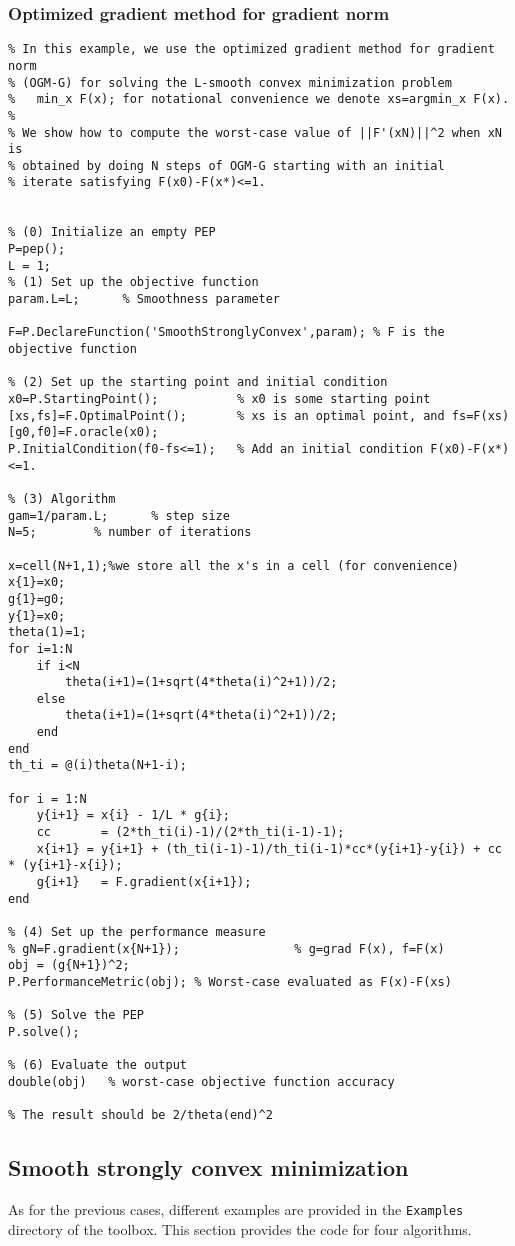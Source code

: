 \documentclass[11pt,a4paper]{article}
\begin{document}
\subsubsection{Optimized gradient method for gradient norm}
\begin{lstlisting}
% In this example, we use the optimized gradient method for gradient norm
% (OGM-G) for solving the L-smooth convex minimization problem
%   min_x F(x); for notational convenience we denote xs=argmin_x F(x).
%
% We show how to compute the worst-case value of ||F'(xN)||^2 when xN is
% obtained by doing N steps of OGM-G starting with an initial
% iterate satisfying F(x0)-F(x*)<=1.


% (0) Initialize an empty PEP
P=pep();
L = 1;
% (1) Set up the objective function
param.L=L;      % Smoothness parameter

F=P.DeclareFunction('SmoothStronglyConvex',param); % F is the objective function

% (2) Set up the starting point and initial condition
x0=P.StartingPoint();           % x0 is some starting point
[xs,fs]=F.OptimalPoint(); 		% xs is an optimal point, and fs=F(xs)
[g0,f0]=F.oracle(x0);
P.InitialCondition(f0-fs<=1);   % Add an initial condition F(x0)-F(x*)<=1.

% (3) Algorithm
gam=1/param.L;		% step size
N=5;		% number of iterations

x=cell(N+1,1);%we store all the x's in a cell (for convenience)
x{1}=x0;
g{1}=g0;
y{1}=x0;
theta(1)=1;
for i=1:N
	if i<N
		theta(i+1)=(1+sqrt(4*theta(i)^2+1))/2;
	else
		theta(i+1)=(1+sqrt(4*theta(i)^2+1))/2;
	end
end
th_ti = @(i)theta(N+1-i);

for i = 1:N
	y{i+1} = x{i} - 1/L * g{i};
	cc       = (2*th_ti(i)-1)/(2*th_ti(i-1)-1);
	x{i+1} = y{i+1} + (th_ti(i-1)-1)/th_ti(i-1)*cc*(y{i+1}-y{i}) + cc * (y{i+1}-x{i});
	g{i+1}   = F.gradient(x{i+1});
end

% (4) Set up the performance measure
% gN=F.gradient(x{N+1});                % g=grad F(x), f=F(x)
obj = (g{N+1})^2;
P.PerformanceMetric(obj); % Worst-case evaluated as F(x)-F(xs)

% (5) Solve the PEP
P.solve();

% (6) Evaluate the output
double(obj)   % worst-case objective function accuracy

% The result should be 2/theta(end)^2
\end{lstlisting}
\newpage 
\subsection{Smooth strongly convex minimization}
As for the previous cases, different examples are provided in the \verb?Examples? directory of the toolbox. This section provides the code for four algorithms.
\end{document}
